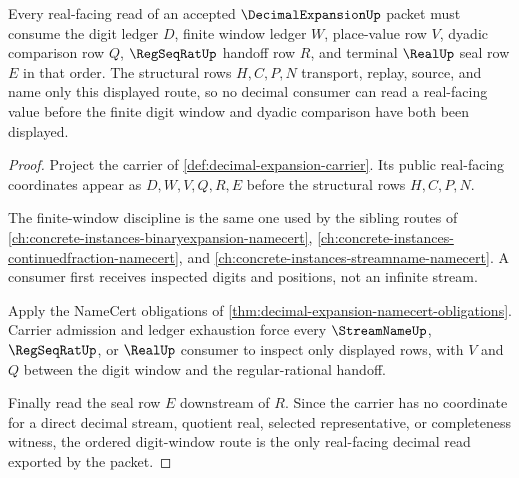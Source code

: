 \begin{theorem}
\label{thm:decimal-expansion-digit-window-obligations}
Every real-facing read of an accepted $\DecimalExpansionUp$ packet must consume the digit ledger $D$, finite window ledger $W$, place-value row $V$, dyadic comparison row $Q$, $\RegSeqRatUp$ handoff row $R$, and terminal $\RealUp$ seal row $E$ in that order. The structural rows $H,C,P,N$ transport, replay, source, and name only this displayed route, so no decimal consumer can read a real-facing value before the finite digit window and dyadic comparison have both been displayed.
\end{theorem}
\begin{proof}
Project the carrier of \autoref{def:decimal-expansion-carrier}. Its public real-facing coordinates appear as $D,W,V,Q,R,E$ before the structural rows $H,C,P,N$.

The finite-window discipline is the same one used by the sibling routes of \autoref{ch:concrete-instances-binaryexpansion-namecert}, \autoref{ch:concrete-instances-continuedfraction-namecert}, and \autoref{ch:concrete-instances-streamname-namecert}. A consumer first receives inspected digits and positions, not an infinite stream.

Apply the NameCert obligations of \autoref{thm:decimal-expansion-namecert-obligations}. Carrier admission and ledger exhaustion force every $\StreamNameUp$, $\RegSeqRatUp$, or $\RealUp$ consumer to inspect only displayed rows, with $V$ and $Q$ between the digit window and the regular-rational handoff.

Finally read the seal row $E$ downstream of $R$. Since the carrier has no coordinate for a direct decimal stream, quotient real, selected representative, or completeness witness, the ordered digit-window route is the only real-facing decimal read exported by the packet.
\end{proof}

